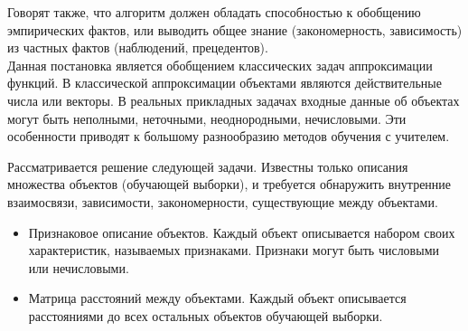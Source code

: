Говорят также, что алгоритм должен обладать способностью к обобщению эмпирических фактов, или выводить общее знание (закономерность, зависимость) из частных фактов (наблюдений, прецедентов). \\

Данная постановка является обобщением классических задач аппроксимации функций. В классической аппроксимации объектами являются действительные числа или векторы. В реальных прикладных задачах входные данные об объектах могут быть неполными, неточными, неоднородными, нечисловыми. Эти особенности приводят к большому разнообразию методов обучения с учителем.

Рассматривается решение следующей задачи. Известны только описания множества объектов (обучающей выборки), и требуется обнаружить внутренние взаимосвязи, зависимости, закономерности, существующие между объектами.

\begin{itemize}
  \item Признаковое описание объектов. Каждый объект описывается набором своих характеристик, называемых признаками. Признаки могут быть числовыми или нечисловыми.
  \item Матрица расстояний между объектами. Каждый объект описывается расстояниями до всех остальных объектов обучающей выборки.
\end{itemize}
\

